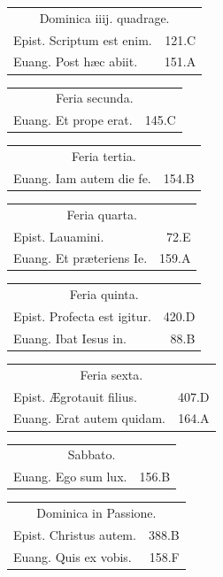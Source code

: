 \documentclass[a5paper,10pt]{book}
\def\ae{æ}
\def\AE{Æ}
\begin{document}
\begin{multicols*}{2}
\begin{tabular}{l r}
\multicolumn{2}{c}{\color{red} Dominica iiij. quadrage.}\\
Epist. Scriptum est enim. & 121.C\\
Euang. Post h\ae c abiit. & 151.A\\
\end{tabular}
\begin{tabular}{l r}
\multicolumn{2}{c}{\color{red} Feria secunda.}\\
Euang. Et prope erat. & 145.C\\
\end{tabular}
\begin{tabular}{l r}
\multicolumn{2}{c}{\color{red} Feria tertia.}\\
Euang. Iam autem die fe. & 154.B\\
\end{tabular}
\begin{tabular}{l r}
\multicolumn{2}{c}{\color{red} Feria quarta.}\\
Epist. Lauamini. & 72.E\\
Euang. Et pr\ae teriens Ie. & 159.A\\
\end{tabular}
\begin{tabular}{l r}
\multicolumn{2}{c}{\color{red} Feria quinta.}\\
Epist. Profecta est igitur. & 420.D\\
Euang. Ibat Iesus in. & 88.B\\
\end{tabular}
\begin{tabular}{l r}
\multicolumn{2}{c}{\color{red} Feria sexta.}\\
Epist. \AE grotauit filius. & 407.D\\
Euang. Erat autem quidam. & 164.A\\
\end{tabular}
\begin{tabular}{l r}
\multicolumn{2}{c}{\color{red} Sabbato.}\\
Euang. Ego sum lux. & 156.B\\
\end{tabular}
\begin{tabular}{l r}
\multicolumn{2}{c}{\color{red} Dominica in Passione.}\\
Epist. Christus autem. & 388.B\\
Euang. Quis ex vobis. & 158.F\\
\end{tabular}
\begin{tabular}{l r}

\end{tabular}
\end{multicols*}
\end{document}

